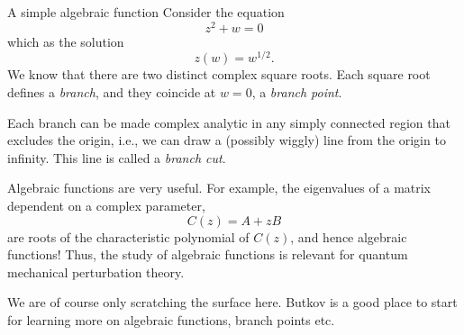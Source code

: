 \begin{myExample}{A simple algebraic function}{}
Consider the equation
\begin{equation}
    z^2 + w = 0
\end{equation}
which as the solution 
\begin{equation}
    z(w) = w^{1/2}.
\end{equation}
We know that there are two distinct complex square roots. Each square root defines a \emph{branch}, and they coincide at $w=0$, a \emph{branch point}.

Each branch can be made complex analytic in any simply connected region that excludes the origin, i.e., we can draw a (possibly wiggly) line from the origin to infinity. This line is called a \emph{branch cut}.
\end{myExample}

Algebraic functions are very useful. For example, the eigenvalues of a matrix dependent on a complex parameter,
\begin{equation}
    C(z) = A + z B
\end{equation}
are roots of the characteristic polynomial of $C(z)$, and hence algebraic functions! Thus, the study of algebraic functions is relevant for quantum mechanical perturbation theory.

We are of course only scratching the surface here. Butkov is a good place to start for learning more on algebraic functions, branch points etc.


